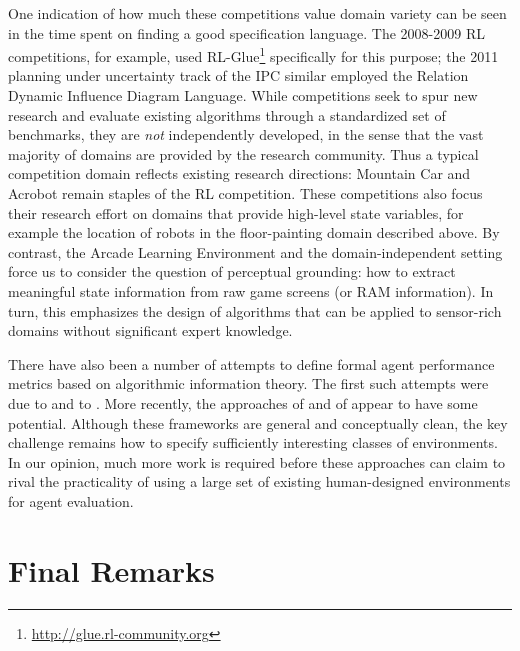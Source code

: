 \documentclass[twoside,11pt]{article}
\begin{document}
One indication of how much these competitions value domain variety can be seen in the time spent on finding a good specification language. The 2008-2009 RL competitions, for example, used RL-Glue\footnote{\url{http://glue.rl-community.org}} specifically for this purpose; the 2011 planning under uncertainty track of the IPC similar employed the Relation Dynamic Influence Diagram Language. While competitions seek to spur new research and evaluate existing algorithms through a standardized set of benchmarks, they are \emph{not} independently developed, in the sense that the vast majority of domains are provided by the research community. Thus a typical competition domain reflects existing research directions: Mountain Car and Acrobot remain staples of the RL competition. These competitions also focus their research effort on domains that provide high-level state variables, for example the location of robots in the floor-painting domain described above. By contrast, the Arcade Learning Environment and the domain-independent setting force us to consider the question of perceptual grounding: how to extract meaningful state information from raw game screens (or RAM information). In turn, this emphasizes the design of algorithms that can be applied to sensor-rich domains without significant expert knowledge. 

There have also been a number of attempts to define formal agent performance metrics based on algorithmic information theory.
The first such attempts were due to  and to .
More recently, the approaches of  and of  appear to have some potential.
Although these frameworks are general and conceptually clean, the key challenge remains how to specify sufficiently interesting classes of environments.
In our opinion, much more work is required before these approaches can claim to rival the practicality of using a large set of existing human-designed environments for agent evaluation.

\section{Final Remarks}
\label{sec:final-remarks}
\end{document}
